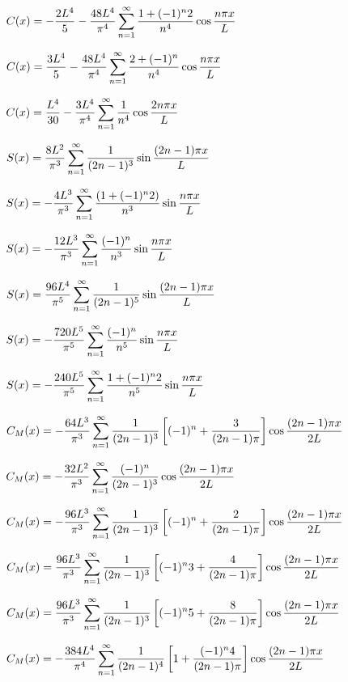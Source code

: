 $C(x)=\displaystyle-\frac{2L^{4}}{5}-\frac{48L^{4}}{\pi^{4}}\sum_{n=1}^{\infty}\frac{1+(-1)^{n}2}{n^{4}}\cos\frac{n\pi x}{L}$

$C(x)=\displaystyle\frac{3L^{4}}{5}-\frac{48L^{4}}{\pi^{4}}\sum_{n=1}^{\infty}\frac{2+(-1)^{n}}{n^{4}}\cos\frac{n\pi x}{L}$

$\displaystyle C(x)=\frac{L^{4}}{30}-\frac{3L^{4}}{\pi^{4}}\sum_{n=1}^{\infty}\frac{1}{n^{4}}\cos\frac{2n\pi x}{L}$

$S(x)=\displaystyle\frac{8L^{2}}{\pi^{3}}\sum_{n=1}^{\infty}\frac{1}{(2n-1)^{3}}
\sin\frac{(2n-1)\pi x}{L}$

$S(x)=\displaystyle-\frac{4L^{3}}{\pi^{3}}\sum_{n=1}^{\infty}\frac{(1+(-1)^{n}2)}{n^{3}}
\sin\frac{n\pi x}{L}$

$S(x)=\displaystyle-\frac{12L^{3}}{\pi^{3}}\sum_{n=1}^{\infty}\frac{(-1)^{n}}{n^{3}}
\sin\frac{n\pi x}{L}$

$S(x)=\displaystyle\frac{96L^{4}}{\pi^{5}}\sum_{n=1}^{\infty}\frac{1}{(2n-1)^{5}}\sin\frac{(2n-1)\pi
x}{L}$

$S(x)=\displaystyle-\frac{720L^{5}}{\pi^{5}}\sum_{n=1}^{\infty}\frac{(-1)^{n}}{n^{5}}\sin\frac{n\pi
x}{L}$

$S(x)=\displaystyle-\frac{240L^{5}}{\pi^{5}}\sum_{n=1}^{\infty}\frac{1+(-1)^{n}2}{n^{5}}\sin\frac{n\pi
x}{L}$

$C_{M}(x)=-\displaystyle\frac{64L^{3}}{\pi^{3}}\sum_{n=1}^{\infty}\frac{1}{(2n-1)^{3}}\left[
(-1)^{n}+\frac{3}{(2n-1)\pi}\right]\cos\frac{(2n-1)\pi
x}{2L}$

$C_{M}(x)=-\displaystyle
\frac{32L^{2}}{\pi^{3}}\sum_{n=1}^{\infty}\frac{(-1)^{n}}{(2n-1)^{3}}\cos\frac{(2n-1)\pi x}{2L}$

$C_{M}(x)=-\displaystyle\frac{96L^{3}}{\pi^{3}}\sum_{n=1}^{\infty}\frac{1}{(2n-1)^{3}}\left[
(-1)^{n}+\frac{2}{(2n-1)\pi}\right]\cos\frac{(2n-1)\pi
x}{2L}$

$C_{M}(x)=\displaystyle\frac{96L^{3}}{\pi^{3}}\sum_{n=1}^{\infty}\frac{1}{(2n-1)^{3}}\left[
(-1)^{n}3+\frac{4}{(2n-1)\pi}\right]\cos\frac{(2n-1)\pi
x}{2L}$

$C_{M}(x)=\displaystyle\frac{96L^{3}}{\pi^{3}}\sum_{n=1}^{\infty}\frac{1}{(2n-1)^{3}}\left[
(-1)^{n}5+\frac{8}{(2n-1)\pi}\right]\cos\frac{(2n-1)\pi
x}{2L}$

$C_{M}(x)=-\displaystyle\frac{384L^{4}}{\pi^{4}}\sum_{n=1}^{\infty}\frac{1}{(2n-1)^{4}}\left[
1+\frac{(-1)^{n}4}{(2n-1)\pi}\right]\cos\frac{(2n-1)\pi
x}{2L}$

